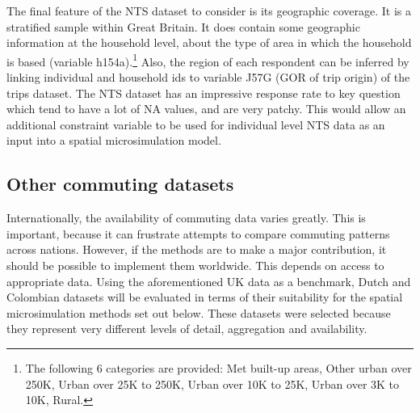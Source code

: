 The final feature of the NTS dataset to consider is its geographic coverage. It
is a stratified sample within Great Britain. It does contain some geographic
information at the household level, about the type of area in which the
household is based (variable h154a).\footnote{The following 6 categories are
provided:
 Met built-up areas,
 Other urban over 250K,
 Urban over 25K to 250K,
 Urban over 10K to 25K,
 Urban over 3K to 10K,
 Rural.}
Also, the region of each respondent can be inferred by linking individual and
household ids to variable J57G (GOR of trip origin) of the trips dataset.
The NTS dataset has an impressive response rate to key question which tend to
have a lot of NA values, and are very patchy. This would allow an
additional constraint variable to be used for individual level NTS data as an
input into a spatial microsimulation model.

\subsection{Other commuting datasets}
Internationally, the availability of commuting data varies greatly.
This is important, because it can frustrate attempts to compare commuting
patterns across nations. However, if the methods
are to make a major contribution, it should be possible to implement them
worldwide. This depends on access to appropriate data.
Using the aforementioned UK data as a benchmark, Dutch and Colombian datasets
will be evaluated in terms of their suitability for the spatial microsimulation
methods set out below. These datasets were selected because they represent
very different levels of detail, aggregation and availability.

